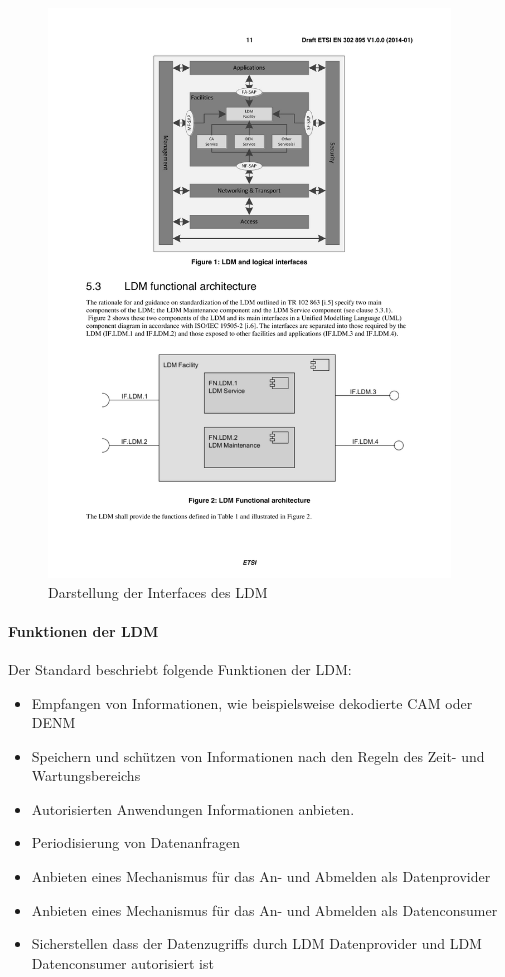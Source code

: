 \begin{figure}[htbp]
	\includegraphics[width=0.95\textwidth]{content/images/04_facilitylayer/ldmFunktionelleInterfaces.pdf}
	\caption{Darstellung der Interfaces des LDM \cite{en302895}}
	\label{fig:ldmInterfaces}
\end{figure}



\paragraph{Funktionen der LDM}
Der Standard \cite{en302895} beschriebt folgende Funktionen der \ac{LDM}:
\begin{itemize}
	\item Empfangen von Informationen, wie beispielsweise dekodierte \ac{CAM} oder \ac{DENM}
	\item Speichern und schützen  von Informationen nach den Regeln des Zeit- und Wartungsbereichs
	\item Autorisierten Anwendungen Informationen anbieten. 
	\item Periodisierung von Datenanfragen
	\item Anbieten eines Mechanismus für das An- und Abmelden als Datenprovider
	\item Anbieten eines Mechanismus für das An- und Abmelden als Datenconsumer
	\item Sicherstellen dass der Datenzugriffs durch \ac{LDM} Datenprovider und \ac{LDM} Datenconsumer autorisiert ist
\end{itemize}



